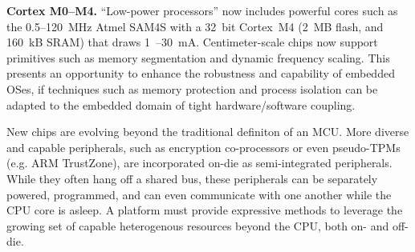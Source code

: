 \smallskip\noindent
\textbf{Cortex M0--M4.}
``Low-power processors'' now includes powerful cores such as the
0.5--120~MHz Atmel SAM4S with a 32~bit Cortex~M4 (2~MB flash,
and 160~kB SRAM) that draws 1~\uA--30~mA.
%
Centimeter-scale chips now support primitives such as memory segmentation and
dynamic frequency scaling. This presents an opportunity to enhance the
robustness and capability of embedded OSes, if techniques such as memory
protection and process isolation can be adapted to the embedded domain of
tight hardware/software coupling.
%

New chips are evolving beyond the traditional definiton of an MCU.  
More diverse
and capable peripherals, such as encryption co-processors or even pseudo-TPMs
(e.g. ARM TrustZone), are incorporated on-die as semi-integrated peripherals.
While they often hang off a shared bus, these peripherals can be separately
powered, programmed, and can even communicate with one another while the CPU
core is asleep. A platform must provide expressive methods to leverage
the growing set of capable heterogenous resources beyond the CPU, both on- and
off-die.




%


